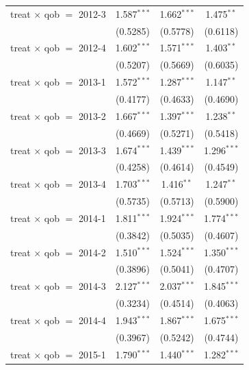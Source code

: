 \begin{table}[H]
\begin{tabular}{lccc}
      treat $\times$ qob $=$ 2012-3  & 1.587$^{***}$ & 1.662$^{***}$  & 1.475$^{**}$\\   
                                     & (0.5285)      & (0.5778)       & (0.6118)\\   
      treat $\times$ qob $=$ 2012-4  & 1.602$^{***}$ & 1.571$^{***}$  & 1.403$^{**}$\\   
                                     & (0.5207)      & (0.5669)       & (0.6035)\\   
      treat $\times$ qob $=$ 2013-1  & 1.572$^{***}$ & 1.287$^{***}$  & 1.147$^{**}$\\   
                                     & (0.4177)      & (0.4633)       & (0.4690)\\   
      treat $\times$ qob $=$ 2013-2  & 1.667$^{***}$ & 1.397$^{***}$  & 1.238$^{**}$\\   
                                     & (0.4669)      & (0.5271)       & (0.5418)\\   
      treat $\times$ qob $=$ 2013-3  & 1.674$^{***}$ & 1.439$^{***}$  & 1.296$^{***}$\\   
                                     & (0.4258)      & (0.4614)       & (0.4549)\\   
      treat $\times$ qob $=$ 2013-4  & 1.703$^{***}$ & 1.416$^{**}$   & 1.247$^{**}$\\   
                                     & (0.5735)      & (0.5713)       & (0.5900)\\   
      treat $\times$ qob $=$ 2014-1  & 1.811$^{***}$ & 1.924$^{***}$  & 1.774$^{***}$\\   
                                     & (0.3842)      & (0.5035)       & (0.4607)\\   
      treat $\times$ qob $=$ 2014-2  & 1.510$^{***}$ & 1.524$^{***}$  & 1.350$^{***}$\\   
                                     & (0.3896)      & (0.5041)       & (0.4707)\\   
      treat $\times$ qob $=$ 2014-3  & 2.127$^{***}$ & 2.037$^{***}$  & 1.845$^{***}$\\   
                                     & (0.3234)      & (0.4514)       & (0.4063)\\   
      treat $\times$ qob $=$ 2014-4  & 1.943$^{***}$ & 1.867$^{***}$  & 1.675$^{***}$\\   
                                     & (0.3967)      & (0.5242)       & (0.4744)\\   
      treat $\times$ qob $=$ 2015-1  & 1.790$^{***}$ & 1.440$^{***}$  & 1.282$^{***}$\\   

\end{tabular}
\end{table}

